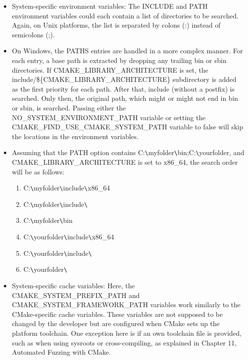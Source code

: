 \begin{itemize}
\item 
System-specific environment variables: The INCLUDE and PATH environment variables could each contain a list of directories to be searched. Again, on Unix platforms, the list is separated by colons (:) instead of semicolons (;).

\item 
On Windows, the PATHS entries are handled in a more complex manner. For each entry, a base path is extracted by dropping any trailing bin or sbin directories. If CMAKE\_LIBRARY\_ARCHITECTURE is set, the include/\$\{CMAKE\_LIBRARY\_ARCHITECTURE\} subdirectory is added as the first priority for each path. After that, include (without a postfix) is searched. Only then, the original path, which might or might not end in bin or sbin, is searched. Passing either the NO\_SYSTEM\_ENVIRONMENT\_PATH variable or setting the CMAKE\_FIND\_USE\_CMAKE\_SYSTEM\_PATH variable to false will skip the locations in the environment variables.

\item 
Assuming that the PATH option contains C:\verb|\|myfolder\verb|\|bin;C:\verb|\|yourfolder, and CMAKE\_LIBRARY\_ARCHITECTURE is set to x86\_64, the search order will be as follows:

\begin{enumerate}
\item 
C:\verb|\|myfolder\verb|\|include\verb|\|x86\_64

\item 
C:\verb|\|myfolder\verb|\|include\verb|\|

\item 
C:\verb|\|myfolder\verb|\|bin

\item 
C:\verb|\|yourfolder\verb|\|include\verb|\|x86\_64

\item 
C:\verb|\|yourfolder\verb|\|include\verb|\|

\item 
C:\verb|\|yourfolder\verb|\|
\end{enumerate}

\item 
System-specific cache variables: Here, the CMAKE\_SYSTEM\_PREFIX\_PATH and CMAKE\_SYSTEM\_FRAMEWORK\_PATH variables work similarly to the CMake-specific cache variables. These variables are not supposed to be changed by the developer but are configured when CMake sets up the platform toolchain. One exception here is if an own toolchain file is provided, such as when using sysroots or cross-compiling, as explained in Chapter 11, Automated Fuzzing with CMake.


\end{itemize}
